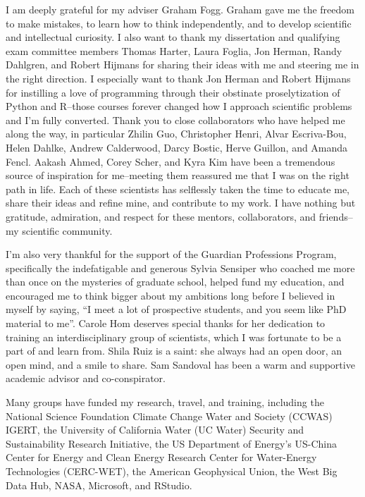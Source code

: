 \begin{frontmatter}
\begin{acknowledgments}
I am deeply grateful for my adviser Graham Fogg. Graham gave me the freedom to make mistakes, to learn how to think independently, and to develop scientific and intellectual curiosity. I also want to thank my dissertation and qualifying exam committee members Thomas Harter, Laura Foglia, Jon Herman, Randy Dahlgren, and Robert Hijmans for sharing their ideas with me and steering me in the right direction. I especially want to thank Jon Herman and Robert Hijmans for instilling a love of programming through their obstinate proselytization of Python and R--those courses forever changed how I approach scientific problems and I'm fully converted. Thank you to close collaborators who have helped me along the way, in particular Zhilin Guo, Christopher Henri, Alvar Escriva-Bou, Helen Dahlke, Andrew Calderwood, Darcy Bostic, Herve Guillon, and Amanda Fencl. Aakash Ahmed, Corey Scher, and Kyra Kim have been a tremendous source of inspiration for me--meeting them reassured me that I was on the right path in life. Each of these scientists has selflessly taken the time to educate me, share their ideas and refine mine, and contribute to my work. I have nothing but gratitude, admiration, and respect for these mentors, collaborators, and friends--my scientific community.

I'm also very thankful for the support of the Guardian Professions Program, specifically the indefatigable and generous Sylvia Sensiper who coached me more than once on the mysteries of graduate school, helped fund my education, and encouraged me to think bigger about my ambitions long before I believed in myself by saying, ``I meet a lot of prospective students, and you seem like PhD material to me''. Carole Hom deserves special thanks for her dedication to training an interdisciplinary group of scientists, which I was fortunate to be a part of and learn from. Shila Ruiz is a saint: she always had an open door, an open mind, and a smile to share. Sam Sandoval has been a warm and supportive academic advisor and co-conspirator. 

Many groups have funded my research, travel, and training, including the National Science Foundation Climate Change Water and Society (CCWAS) IGERT, the University of California Water (UC Water) Security and Sustainability Research Initiative, the US Department of Energy's US-China Center for Energy and Clean Energy Research Center for Water-Energy Technologies (CERC-WET), the American Geophysical Union, the West Big Data Hub, NASA, Microsoft, and RStudio. 


\end{acknowledgments}
\end{frontmatter}

